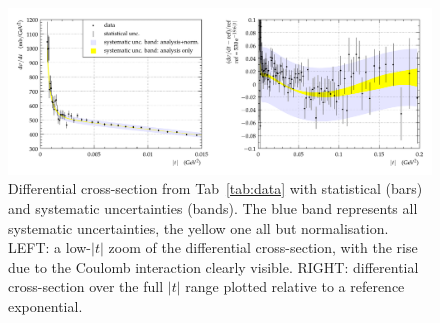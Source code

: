 \begin{figure}
\vskip-5mm
\begin{center}
\includegraphics[width=18cm]{fig/t_dist_tabulation.pdf}
\vskip-3mm
\caption{%
Differential cross-section from Tab~\ref{tab:data} with statistical (bars) and systematic uncertainties (bands). The blue band represents all systematic uncertainties, the yellow one all but normalisation. LEFT: a low-$|t|$ zoom of the differential cross-section, with the rise due to the Coulomb interaction clearly visible. RIGHT: differential cross-section over the full $|t|$ range plotted relative to a reference exponential.
}
\label{fig:dsdt}
\end{center}
\end{figure}

